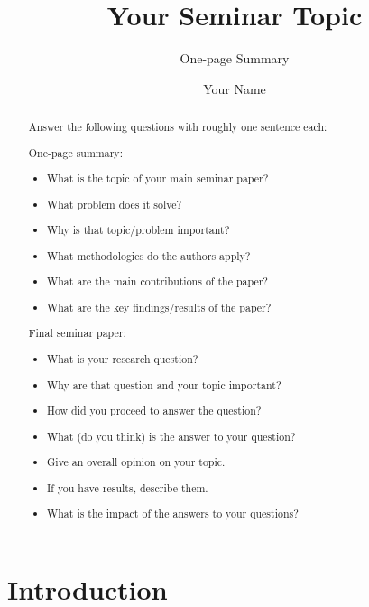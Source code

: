 \documentclass[sigconf]{acmart}
\begin{document}
\title{Your Seminar Topic}

\subtitle{One-page Summary}

\author{Your Name}

\renewcommand{\shortauthors}{Y. Name et al.}


\begin{abstract}
  Answer the following questions with roughly one sentence each:

  One-page summary:
  \begin{itemize}
  \item What is the topic of your main seminar paper?
  \item What problem does it solve?
  \item Why is that topic/problem important?
  \item What methodologies do the authors apply?
  \item What are the main contributions of the paper?
  \item What are the key findings/results of the paper?
  \end{itemize}
  
  Final seminar paper:
  \begin{itemize}
  \item What is your research question?
  \item Why are that question and your topic important?
  \item How did you proceed to answer the question?
  \item What (do you think) is the answer to your question?
  \item Give an overall opinion on your topic.
  \item If you have results, describe them.
  \item What is the impact of the answers to your questions?
  \end{itemize}

\end{abstract}

\maketitle

\section{Introduction}
\end{document}
